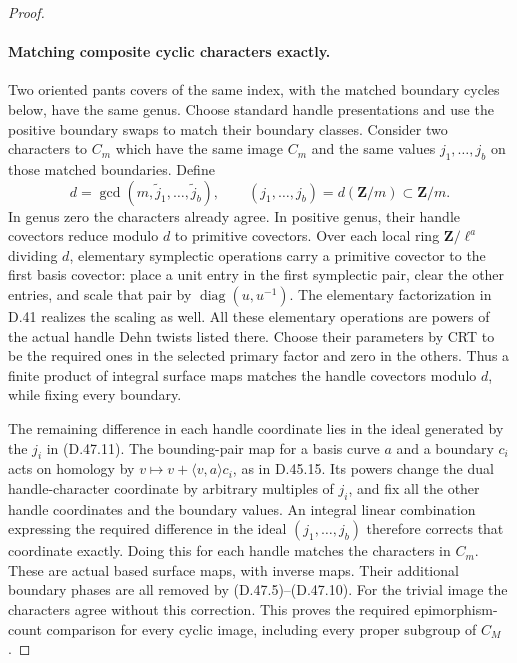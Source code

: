\begin{proof}
\paragraph{Matching composite cyclic characters exactly.}
Two oriented pants covers of the same index, with the matched
boundary cycles below, have the same genus. Choose standard
handle presentations and use the positive boundary swaps to
match their boundary classes. Consider two characters to
\(C_m\) which have the same image \(C_m\) and the same
values \(j_1,\ldots,j_b\) on those matched boundaries.
Define
\[
       d=\gcd(m,\widetilde j_1,\ldots,\widetilde j_b),
       \qquad (j_1,\ldots,j_b)=d(\mathbf Z/m)\subset\mathbf Z/m.
 \tag{D.47.11}
\]
In genus zero the characters already agree. In positive
genus, their handle covectors reduce modulo \(d\) to
primitive covectors. Over each local ring
\(\mathbf Z/\ell^a\) dividing \(d\), elementary symplectic
operations carry a primitive covector to the first basis
covector: place a unit entry in the first symplectic pair,
clear the other entries, and scale that pair by
\(\operatorname{diag}(u,u^{-1})\). The elementary
factorization in D.41 realizes the scaling as well.
All these elementary operations are powers of the actual
handle Dehn twists listed there. Choose their parameters
by CRT to be the required ones in the selected primary
factor and zero in the others. Thus a finite product of
integral surface maps matches the handle covectors modulo
\(d\), while fixing every boundary.

The remaining difference in each handle coordinate lies
in the ideal generated by the \(j_i\) in
\textup{(D.47.11)}. The bounding-pair map for a basis curve
\(a\) and a boundary \(c_i\) acts on homology by
\(v\mapsto v+\langle v,a\rangle c_i\), as in D.45.15.
Its powers change the dual handle-character coordinate by
arbitrary multiples of \(j_i\), and fix all the other
handle coordinates and the boundary values. An integral
linear combination expressing the required difference in
the ideal \((j_1,\ldots,j_b)\) therefore corrects that
coordinate exactly. Doing this for each handle matches
the characters in \(C_m\). These are actual based surface
maps, with inverse maps. Their additional boundary phases
are all removed by \textup{(D.47.5)--(D.47.10)}.
For the trivial image the characters agree without this
correction. This proves the required epimorphism-count
comparison for every cyclic image, including every proper
subgroup of \(C_M\).


\end{proof}
